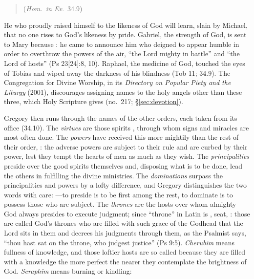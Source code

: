 \begin{quote}
(\emph{Hom.\ in Ev.}\ 34.9)
\end{quote}

\noindent He who proudly raised himself to the likeness of God will learn,
slain by Michael, that no one rises to God's likeness by pride. Gabriel, the
strength of God, is sent to Mary because : he came to announce him who deigned to appear humble in order to
overthrow the powers of the air, ``the Lord mighty in battle'' and ``the Lord
of hosts'' (Ps 23[24]:8, 10). Raphael, the medicine of God, touched the eyes
of Tobias and wiped away the darkness of his blindness (Tob 11; 34.9). The Congregation for Divine
Worship, in its \emph{Directory on Popular Piety and the Liturgy} (2001),
discourages assigning names to the holy angels other than these three, which
Holy Scripture gives (no.~217; \S\ref{sec:devotion}).

Gregory then runs through the names of the other orders, each taken from its
office (34.10). The \emph{virtues} are those spirits , through whom signs and miracles are most
often done. The \emph{powers} have received this more mightily than the
rest of their order, : the adverse powers are subject to their rule and
are curbed by their power, lest they tempt the hearts of men as much as they
wish. The \emph{principalities} preside over the good spirits themselves and,
disposing what is to be done, lead the others in fulfilling the divine
ministries. The \emph{dominations} surpass the principalities and powers by
a lofty difference, and Gregory distinguishes the two words with care:
---to preside is to be first among the
rest, to dominate is to possess those who are subject. The \emph{thrones}
are the hosts over whom almighty God always presides to execute judgment;
since ``throne'' in Latin is , seat, : those are called God's thrones who are filled
with such grace of the Godhead that the Lord sits in them and decrees his
judgments through them, as the Psalmist says, ``thou hast sat on the throne,
who judgest justice'' (Ps 9:5). \emph{Cherubim} means fullness of knowledge,
and those loftier hosts are so called because they are filled with a
knowledge the more perfect the nearer they contemplate the brightness of God.
\emph{Seraphim} means burning or kindling:

